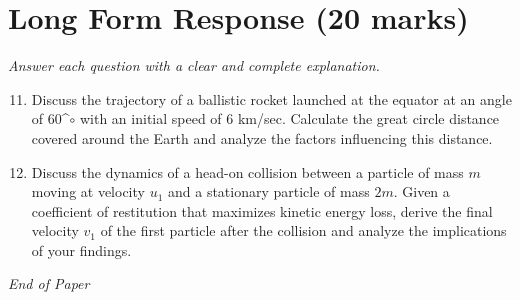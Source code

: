 \documentclass[12pt]{article}
\begin{document}
\section*{Long Form Response (20 marks)}
\textit{Answer each question with a clear and complete explanation.}
\begin{enumerate}[label=\arabic*.]
\setcounter{enumi}{10}
\item Discuss the trajectory of a ballistic rocket launched at the equator at an angle of 60^\ensuremath{\circ} with an initial speed of 6 km/sec. Calculate the great circle distance covered around the Earth and analyze the factors influencing this distance.
\item Discuss the dynamics of a head-on collision between a particle of mass \( m \) moving at velocity \( u_1 \) and a stationary particle of mass \( 2 m \). Given a coefficient of restitution that maximizes kinetic energy loss, derive the final velocity \( v_1 \) of the first particle after the collision and analyze the implications of your findings.
\end{enumerate}

\vfill
\noindent\textit{End of Paper}
\end{document}
